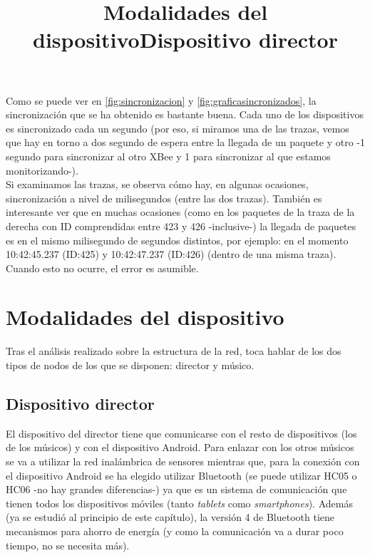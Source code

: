 Como se puede ver en \ref{fig:sincronizacion} y \ref{fig:graficasincronizados},
la sincronización que se ha obtenido es bastante buena. Cada uno de los dispositivos
es sincronizado cada un segundo (por eso, si miramos una de las trazas,
vemos que hay en torno a dos segundo de espera entre la llegada de un paquete y otro
-1 segundo para sincronizar al otro XBee y 1 para sincronizar al que estamos monitorizando-).\\

Si examinamos las trazas, se observa cómo hay, en algunas ocasiones, sincronización
a nivel de milisegundos (entre las dos trazas). También es interesante ver que en muchas ocasiones (como en los
paquetes de la traza de la derecha con ID comprendidas entre 423 y 426 -inclusive-) la
llegada de paquetes es en el mismo milisegundo de segundos distintos, por ejemplo: en el
momento 10:42:45.237 (ID:425) y 10:42:47.237 (ID:426) (dentro de una misma traza).
Cuando esto no ocurre, el error es asumible.\\



\section{Modalidades del dispositivo}
\title{Modalidades del dispositivo}

Tras el análisis realizado sobre la estructura de la red, toca hablar de los dos tipos
de nodos de los que se disponen: director y músico.

\subsection{Dispositivo director}
\title{Dispositivo director}

El dispositivo del director tiene que comunicarse con el resto de dispositivos (los
de los músicos) y con el dispositivo Android. Para enlazar con los otros músicos
se va a utilizar la red inalámbrica de sensores mientras que, para la conexión
con el dispositivo Android se ha elegido utilizar Bluetooth (se puede utilizar HC05 \cite{bthc05} o HC06 -no hay grandes
diferencias-) ya que es un sistema de comunicación que tienen todos los dispositivos móviles (tanto \textit{tablets} como
\textit{smartphones}). Además (ya se estudió al principio de este capítulo), la versión
4 de Bluetooth tiene mecanismos para ahorro de energía (y como la comunicación va a durar
poco tiempo, no se necesita más).\\


